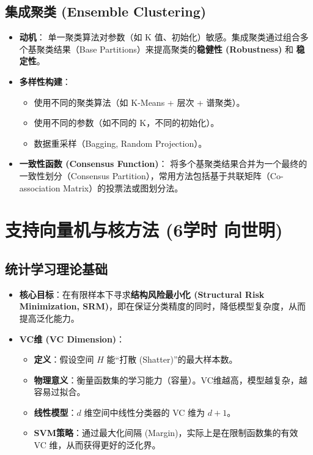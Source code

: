 \documentclass[a4paper, 11pt]{ctexart}
\begin{document}
\subsection{集成聚类 (Ensemble Clustering)}
\begin{itemize}
    \item \textbf{动机}：
    单一聚类算法对参数（如 K 值、初始化）敏感。集成聚类通过组合多个基聚类结果（Base Partitions）来提高聚类的\textbf{稳健性 (Robustness)} 和 \textbf{稳定性}。
    \item \textbf{多样性构建}：
    \begin{itemize}
        \item 使用不同的聚类算法（如 K-Means + 层次 + 谱聚类）。
        \item 使用不同的参数（如不同的 K，不同的初始化）。
        \item 数据重采样（Bagging, Random Projection）。
    \end{itemize}
    \item \textbf{一致性函数 (Consensus Function)}：
    将多个基聚类结果合并为一个最终的一致性划分（Consensus Partition），常用方法包括基于共联矩阵（Co-association Matrix）的投票法或图划分法。
\end{itemize}

\newpage
\section{支持向量机与核方法 \small{(6学时 向世明)}}

\subsection{统计学习理论基础}
\begin{itemize}
    \item \textbf{核心目标}：在有限样本下寻求\textbf{结构风险最小化 (Structural Risk Minimization, SRM)}，即在保证分类精度的同时，降低模型复杂度，从而提高泛化能力。
    \item \textbf{VC维 (VC Dimension)}：
    \begin{itemize}
        \item \textbf{定义}：假设空间 $H$ 能“打散 (Shatter)”的最大样本数。
        \item \textbf{物理意义}：衡量函数集的学习能力（容量）。VC维越高，模型越复杂，越容易过拟合。
        \item \textbf{线性模型}：$d$ 维空间中线性分类器的 VC 维为 $d+1$。
        \item \textbf{SVM策略}：通过最大化间隔 (Margin)，实际上是在限制函数集的有效 VC 维，从而获得更好的泛化界。
    \end{itemize}
\end{itemize}
\end{document}
